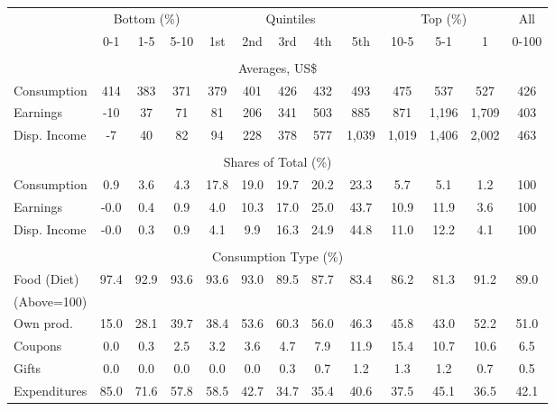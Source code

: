 \begin{tabular}{l c c c| c c c c c| c c c| c}
\toprule
&\multicolumn{3}{c|}{Bottom (\%)} & \multicolumn{5}{c|}{Quintiles} & \multicolumn{3}{c|}{Top (\%)} & All  \\
& 0-1 & 1-5 & 5-10 &  1st & 2nd & 3rd & 4th & 5th & 10-5 & 5-1 & 1 & 0-100 \\
\midrule \\
\multicolumn{13}{c}{Averages, US\$} \\
\midrule
Consumption  & 414  & 383  & 371  & 379  & 401  & 426  & 432  & 493  & 475  & 537  & 527  & 426 \\
Earnings         & -10 & 37 & 71 & 81 & 206 & 341 & 503 & 885 & 871 & 1,196 & 1,709 & 403 \\
Disp. Income & -7 & 40 & 82 & 94 & 228 & 378 & 577 & 1,039 & 1,019 & 1,406 & 2,002 & 463 \\
\midrule \\
\multicolumn{13}{c}{Shares of Total (\%)} \\
\midrule
Consumption  & 0.9   & 3.6   & 4.3   & 17.8   & 19.0   & 19.7   & 20.2   & 23.3   & 5.7   & 5.1   & 1.2   & 100 \\
Earnings         & -0.0  & 0.4  & 0.9  & 4.0  & 10.3  & 17.0  & 25.0  & 43.7  & 10.9  & 11.9  & 3.6  & 100 \\
Disp. Income & -0.0  & 0.3  & 0.9  & 4.1  & 9.9  & 16.3  & 24.9  & 44.8  & 11.0  & 12.2  & 4.1  & 100 \\
\midrule \\
\multicolumn{13}{c}{Consumption Type (\%)}  \\
\midrule
Food (Diet)  & 97.4 & 92.9 & 93.6 & 93.6 & 93.0 & 89.5 & 87.7 & 83.4 & 86.2 & 81.3 & 91.2 & 89.0 \\
(Above=100) & & & & & & & & & & & &  \\
\hspace{.3cm} Own prod.  & 15.0 & 28.1 & 39.7 & 38.4 & 53.6 & 60.3 & 56.0 & 46.3 & 45.8 & 43.0 & 52.2 & 51.0 \\
\hspace{.3cm} Coupons    & 0.0 & 0.3 & 2.5 & 3.2 & 3.6 & 4.7 & 7.9 & 11.9 & 15.4 & 10.7 & 10.6 & 6.5 \\
\hspace{.3cm} Gifts      & 0.0 & 0.0 & 0.0 & 0.0 & 0.0 & 0.3 & 0.7 & 1.2 & 1.3 & 1.2 & 0.7 & 0.5 \\
\hspace{.3cm} Expenditures  & 85.0 & 71.6 & 57.8 & 58.5 & 42.7 & 34.7 & 35.4 & 40.6 & 37.5 & 45.1 & 36.5 & 42.1 \\

\end{tabular}
